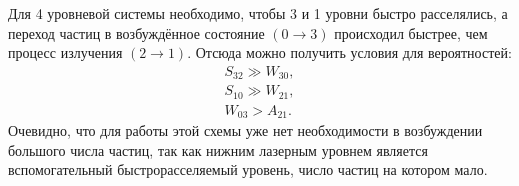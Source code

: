 Для 4 уровневой системы необходимо, чтобы 3 и 1 уровни быстро расселялись, а
переход частиц в возбуждённое состояние \( (0\to3) \) происходил быстрее, чем
процесс излучения \( (2\to1) \). Отсюда можно получить условия для вероятностей:
\begin{gather*}
    S_{32}\gg W_{30},\\
    S_{10}\gg W_{21},\\
    W_{03} > A_{21}.
\end{gather*}
Очевидно, что для работы этой схемы уже нет необходимости в возбуждении большого
числа частиц, так как нижним лазерным уровнем является вспомогательный
быстрорасселяемый уровень, число частиц на котором мало.

